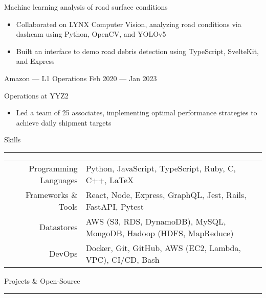 \documentclass{article}
\begin{document}
Machine learning analysis of road surface conditions

\begin{itemize}
	\item Collaborated on LYNX Computer Vision, analyzing road conditions via dashcam using Python, OpenCV, and YOLOv5
	\item Built an interface to demo road debris detection using TypeScript, SvelteKit, and Express
\end{itemize}

Amazon — L1 Operations \hfill Feb 2020 — Jan 2023

Operations at YYZ2

\begin{itemize}
	\item Led a team of 25 associates, implementing optimal performance strategies to achieve daily shipment targets
\end{itemize}



Skills \\
\noindent\rule[8pt]{\linewidth}{0.4pt}


\begin{tabular}{ r l }
 	Programming Languages & Python, JavaScript, TypeScript, Ruby, C, C++, \LaTeX \\ 
 	Frameworks \& Tools & React, Node, Express, GraphQL, Jest, Rails, FastAPI, Pytest \\  
 	Datastores & AWS (S3, RDS, DynamoDB), MySQL, MongoDB, Hadoop (HDFS, MapReduce) \\  
 	DevOps & Docker, Git, GitHub, AWS (EC2, Lambda, VPC), CI/CD, Bash \\  
\end{tabular}



Projects \& Open-Source \\ 
\noindent\rule[8pt]{\linewidth}{0.4pt} \\
\end{document}
